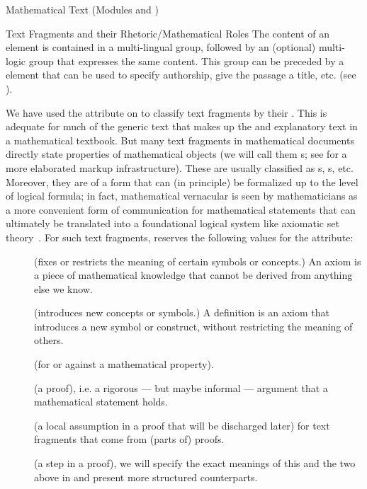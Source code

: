 \begin{tchapter}[id=mtxt,short=Mathematical Text]{Mathematical Text (Modules
  {} and {})}
\begin{tsection}[id=omtext]{Text Fragments and their Rhetoric/Mathematical Roles}
  The content of an {} element is {}
  contained in a multi-lingual {} group, followed by an (optional)
  multi-logic {} group that expresses the same content.  This
  {} group can be preceded by a {} element that can be used
  to specify authorship, give the passage a title, etc. (see {}).

  We have used the {} attribute on {} to classify
  text fragments by their {}. This is adequate for much of the
  generic text that makes up the {} and explanatory text in a
  mathematical textbook. But many text fragments in mathematical documents directly state
  properties of mathematical objects (we will call them
  {s}; see {} for a more elaborated
  markup infrastructure). These are usually classified as {s},
  {s}, etc.  Moreover, they are of a form that can (in principle) be
  formalized up to the level of logical formula; in fact, mathematical vernacular is seen
  by mathematicians as a more convenient form of communication for mathematical statements
  that can ultimately be translated into a foundational logical system like axiomatic set
  theory~\cite{Bernays:ast91}.  For such text fragments, {\omdoc} reserves the following
  values for the {} attribute:
\begin{description}
\item[{}] (fixes or restricts the meaning of certain
  symbols or concepts.) An axiom is a piece of mathematical knowledge that cannot
  be derived from anything else we know.
\item[{}] (introduces new concepts or symbols.) A
  definition is an axiom that introduces a new symbol or construct, without restricting
  the meaning of others.
\item[{}] (for or against a mathematical property).
\item[{}] (a proof), i.e. a rigorous --- but maybe informal
  --- argument that a mathematical statement holds.
\item[{}] (a local assumption in a proof that will be
  discharged later) for text fragments that come from (parts of) proofs.
\item[{}] (a step in a proof), we will specify the exact
  meanings of this and the two above in {} and present more structured
  counterparts.
\end{description} 


\end{tsection}
\end{tchapter}

